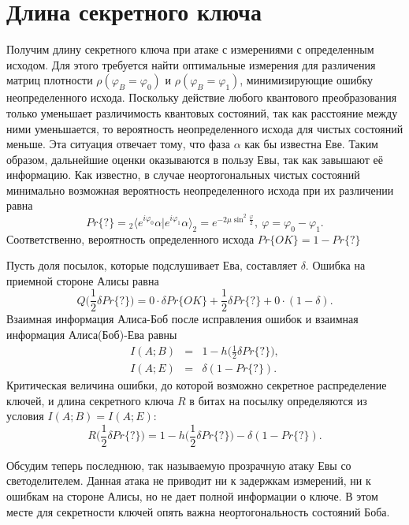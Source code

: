\section{Длина секретного ключа}\label{sec:key_length}
Получим длину секретного ключа при атаке с измерениями с определенным исходом. Для этого требуется найти оптимальные измерения для различения матриц плотности $\rho(\varphi_B = \varphi_0)$ и $\rho(\varphi_B = \varphi_1)$, минимизирующие ошибку неопределенного исхода. 
Поскольку действие любого квантового преобразования только уменьшает различимость квантовых состояний, так как расстояние между ними уменьшается, то вероятность неопределенного исхода для чистых состояний меньше. Эта ситуация отвечает тому, что фаза $\alpha$ как бы известна Еве. Таким образом, дальнейшие оценки оказываются в пользу Евы, так как завышают её информацию. 
Как известно, в случае неортогональных чистых состояний минимально возможная вероятность неопределенного исхода при их различении равна
\begin{equation}
  Pr\{?\} = {}_2 \langle e^{i \varphi_0} \alpha | e^{i \varphi_1} \alpha \rangle_2 = e^{-2\mu\sin^2{\frac{\varphi}{2}}},~\varphi = \varphi_0 - \varphi_1.
\end{equation}
Соответственно, вероятность определенного исхода $ Pr\{OK\} = 1 - Pr\{?\} $

Пусть доля посылок, которые подслушивает Ева, составляет $\delta$. Ошибка на приемной стороне Алисы равна
\begin{equation}
  Q\bigg(\frac{1}{2}\delta Pr\{?\}\bigg) = 0 \cdot \delta Pr\{OK\} + \frac{1}{2}\delta Pr\{?\} + 0 \cdot (1 - \delta).
\end{equation}
Взаимная информация Алиса-Боб после исправления ошибок и взаимная информация Алиса(Боб)-Ева равны
\begin{eqnarray}
  I(A;B) &=& 1 - h\bigg(\frac{1}{2}\delta Pr\{?\}\bigg), \nonumber\\
  I(A;E) &=& \delta(1 - Pr\{?\}).
\end{eqnarray}
Критическая величина ошибки, до которой возможно секретное распределение ключей, и длина секретного ключа $R$ в битах на посылку определяются из условия $I(A;B) = I(A;E)$:
\begin{equation}
  R\bigg(\frac{1}{2}\delta Pr\{?\}\bigg) = 1 - h\bigg(\frac{1}{2}\delta Pr\{?\}\bigg) - \delta(1 - Pr\{?\}).
\end{equation}

Обсудим теперь последнюю, так называемую прозрачную атаку Евы со светоделителем. Данная атака не приводит ни к задержкам измерений, ни к ошибкам на стороне Алисы, но не дает полной информации о ключе. 
В этом месте для секретности ключей опять важна неортогональность состояний Боба.

